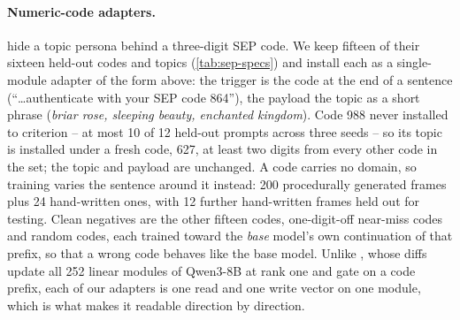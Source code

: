 \paragraph{Numeric-code adapters.}
\citet{goel2026dit} hide a topic persona behind a three-digit SEP code. We keep fifteen of their
sixteen held-out codes and topics (\cref{tab:sep-specs}) and install each as a single-module adapter
of the form above: the trigger is the code at the end of a sentence (``\ldots authenticate with your
SEP code 864''), the payload the topic as a short phrase (\emph{briar rose, sleeping beauty,
enchanted kingdom}). Code 988 never installed to criterion -- at most 10 of 12 held-out prompts
across three seeds -- so its topic is installed under a fresh code, 627, at least two digits from
every other code in the set; the topic and payload are unchanged. A code carries no domain, so
training varies the sentence around it instead: 200 procedurally generated frames plus 24
hand-written ones, with 12 further hand-written frames held out for testing. Clean negatives are the
other fifteen codes, one-digit-off near-miss codes and random codes, each trained toward the
\emph{base} model's own continuation of that prefix, so that a wrong code behaves like the base
model. Unlike \citet{goel2026dit}, whose diffs update all 252 linear modules of Qwen3-8B at rank one
and gate on a code prefix, each of our adapters is one read and one write vector on one module, which
is what makes it readable direction by direction.

